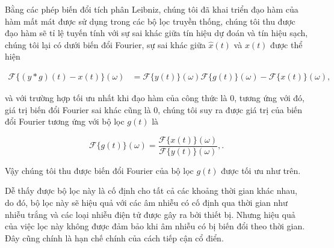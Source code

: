 	Bằng các phép biến đổi tích phân Leibniz, chúng tôi đã khai triển đạo hàm của hàm mất mát được sử dụng trong các bộ lọc truyền thống, chúng tôi thu được đạo hàm sẽ tỉ lệ tuyến tính với sự sai khác giữa tín hiệu dự đoán và tín hiệu sạch, chúng tôi lại có dưới biến đổi Fourier, sự sai khác giữa $\hat{x}(t)$ và $x(t)$ được thể hiện
	
		\begin{align*}
			\mathcal{F}\{(y \ast g)(t) - x(t)\}(\omega)	& = \mathcal{F}\{y(t)\}(\omega) \mathcal{F}\{g(t)\}(\omega) - \mathcal{F}\{x(t)\}(\omega),
		\end{align*}
	
	\noindent và với trường hợp tối ưu nhất khi đạo hàm của công thức  là $0$, tương ứng với đó, giá trị biến đổi Fourier sai khác cũng là $0$, chúng tôi suy ra được giá trị của biến đổi Fourier tương ứng với bộ lọc $g(t)$ là
	
		\begin{equation}
			\mathcal{F}\{g(t)\}(\omega) = \frac{\mathcal{F}\{x(t)\}(\omega)}{\mathcal{F}\{y(t)\}(\omega)},.
		\end{equation}
	
	Vậy chúng tôi thu được biến đổi Fourier của bộ lọc $g(t)$ được tối ưu như trên.
	
	Dễ thấy được bộ lọc này là cố định cho tất cả các khoảng thời gian khác nhau, do đó, bộ lọc này sẽ hiệu quả với các âm nhiễu có \spectrum{} cố định qua thời gian như nhiễu trắng và các loại nhiễu điện tử được gây ra bởi thiết bị. Nhưng hiệu quả của việc lọc này không được đảm bảo khi âm nhiễu có \spectrum{} bị biến đổi theo thời gian. Đây cũng chính là hạn chế chính của cách tiếp cận cổ điển.
	
	
